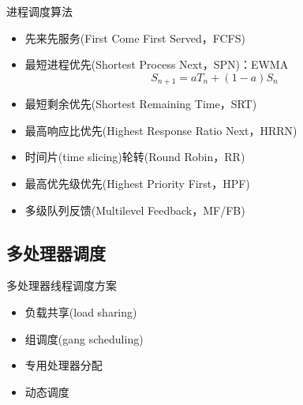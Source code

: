 进程调度算法
\begin{itemize}
\item 先来先服务(First Come First Served，FCFS)
\item 最短进程优先(Shortest Process Next，SPN)：EWMA
\[S_{n+1}=aT_n+(1-a)S_n\]
\item 最短剩余优先(Shortest Remaining Time，SRT)
\item 最高响应比优先(Highest Response Ratio Next，HRRN)
\item 时间片(time slicing)轮转(Round Robin，RR)
\item 最高优先级优先(Highest Priority First，HPF)
\item 多级队列反馈(Multilevel Feedback，MF/FB)
\end{itemize}

\subsection{多处理器调度}
多处理器线程调度方案
\begin{itemize}
    \item 负载共享(load sharing)
    \item 组调度(gang scheduling)
    \item 专用处理器分配
    \item 动态调度
\end{itemize}

